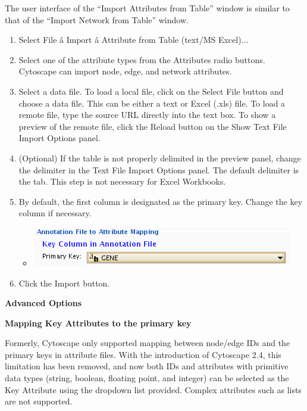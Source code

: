  The user interface of the ``Import Attributes from Table'' window is similar to that of the ``Import Network from Table'' window. 
\begin{enumerate}
\item 

 Select File \^a Import \^a Attribute from Table (text/MS Excel)... 

\item Select one of the attribute types from the Attributes radio buttons. Cytoscape can import node, edge, and network attributes. 
\item Select a data file. To load a local file, click on the Select File button and choose a data file. This can be either a text or Excel (.xls) file. To load a remote file, type the source URL directly into the text box. To show a preview of the remote file, click the Reload button on the Show Text File Import Options panel. 
\item (Optional) If the table is not properly delimited in the preview panel, change the delimiter in the Text File Import Options panel. The default delimiter is the tab. This step is not necessary for Excel Workbooks. 
\item By default, the first column is designated as the primary key. Change the key column if necessary. \begin{itemize}
\item 

 \includegraphics[width=\textwidth]{images/attribute_table_import_primary_key.png} 


\end{itemize}

\item Click the Import button. 

\end{enumerate}


 
\textbf{Advanced Options}


 \textbf{Mapping Key Attributes to the primary key}


 Formerly, Cytoscape only supported mapping between node/edge IDs and the primary keys in attribute files. With the introduction of Cytoscape 2.4, this limitation has been removed, and now both IDs and attributes with primitive data types (string, boolean, floating point, and integer) can be selected as the Key Attribute using the dropdown list provided. Complex attributes such as lists are not supported. 


